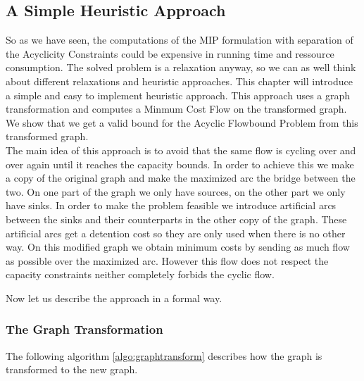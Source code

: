 \newpage
\subsection{A Simple Heuristic Approach}

So as we have seen, the computations of the MIP formulation with separation of the Acyclicity Constraints could be 
expensive in running time and ressource consumption. The solved problem is a relaxation anyway, so we can as well think 
about different relaxations and heuristic approaches. This chapter will introduce a simple and easy to 
implement heuristic approach. This approach uses a graph transformation and computes a Minmum Cost Flow on the 
transformed graph. We show that we get a valid bound for the Acyclic Flowbound Problem from this transformed graph.\\

The main idea of this approach is to avoid that the same flow is cycling over and over again until it reaches the 
capacity bounds. In order to achieve this we make a copy of the original graph and make the maximized arc the bridge 
between the two. On one part of the graph we only have sources, on the other part we only have sinks. In order to make 
the problem feasible we introduce artificial arcs between the sinks and their counterparts in the other copy of the 
graph. These artificial arcs get a detention cost so they are only used when there is no other way. On this modified 
graph we obtain minimum costs by sending as much flow as possible over the maximized arc. However this flow does not 
respect the capacity constraints neither completely forbids the cyclic flow. 

Now let us describe the approach in a formal way.

\subsubsection*{The Graph Transformation}

The following algorithm \ref{algo:graphtransform} describes how the graph is transformed to the new graph.

